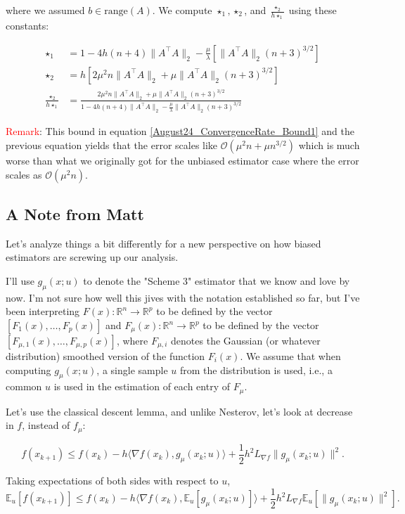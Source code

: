\documentclass{article}
\begin{document}
where we assumed $b \in \text{range}(A)$. We compute $\star_1, \star_2$, and $\frac{\star_2}{h\star_1}$ using these constants:

\begin{align*}
\star_1 & = 1 - 4h(n+4)\|A^\top A\|_2 - \frac{\mu}{\lambda}\left[\|A^\top A\|_2 (n+3)^{3/2}\right] \\ \star_2 & = h\left[2\mu^2 n\| A^\top A\|_2 + \mu \|A^\top A\|_2 (n+3)^{3/2} \right] \\ \frac{\star_2}{h\star_1} & = \frac{2\mu^2 n\| A^\top A\|_2 + \mu \|A^\top A\|_2 (n+3)^{3/2}}{1 - 4h(n+4)\|A^\top A\|_2 - \frac{\mu}{\lambda}\|A^\top A\|_2 (n+3)^{3/2}}
\end{align*}

\textcolor{red}{Remark}: This bound in equation \eqref{August24_ConvergenceRate_Bound1} and the previous equation yields that the error scales like $\mathcal{O}\left(\mu^2 n + \mu n^{3/2}\right)$ which is much worse than what we originally got for the unbiased estimator case where the error scales as $\mathcal{O}(\mu^2 n)$. 

\subsection{A Note from Matt}

Let's analyze things a bit differently for a new perspective on how biased estimators are screwing up our analysis. 

I'll use $g_{\mu}(x;u)$ to denote the "Scheme 3" estimator that we know and love by now. 
I'm not sure how well this jives with the notation established so far, but I've been interpreting 
$F(x):\mathbb{R}^n\to\mathbb{R}^p$ to be defined by the vector $\left[F_1(x),\dots,F_p(x)\right]$ 
and $F_{\mu}(x):\mathbb{R}^n\to\mathbb{R}^p$ to be defined by the vector $\left[F_{\mu,1}(x),\dots,F_{\mu,p}(x)\right]$,
where $F_{\mu,i}$ denotes the Gaussian (or whatever distribution) smoothed version of the function $F_{i}(x)$. 
We assume that when computing $g_{\mu}(x;u)$, a single sample $u$ from the distribution is used, i.e., a common $u$ is used
in the estimation of each entry of $F_{\mu}$. 

Let's use the classical descent lemma, and unlike Nesterov, let's look at decrease in $f$, instead of $f_{\mu}$:

$$f(x_{k+1})\leq f(x_k) - h\langle \nabla f(x_k), g_{\mu}(x_k;u)\rangle + \frac{1}{2}h^2L_{\nabla f}\|g_{\mu}(x_k;u)\|^2.$$ 

Taking expectations of both sides with respect to $u$,
$$\mathbb{E}_{u} \left[f(x_{k+1})\right] \leq f(x_k) - h\langle\nabla f(x_k), \mathbb{E}_u \left[g_{\mu}(x_k;u)\right]\rangle + \frac{1}{2}h^2 L_{\nabla f}\mathbb{E}_u\left[\|g_{\mu}(x_k;u)\|^2\right].$$%
\end{document}
